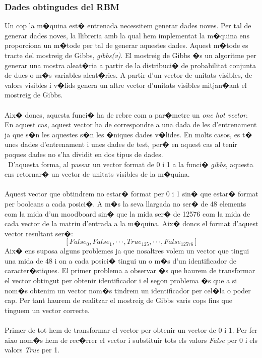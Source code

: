 \documentclass[12pt,a4paper,openright,oneside]{article}
\numberwithin{equation}{section}
\theoremstyle{definition}
\begin{document}
\subsubsection{Dades obtingudes del RBM}
Un cop la m�quina est� entrenada necessitem generar dades noves. Per tal de generar dades noves, la llibreria amb la qual hem implementat la m�quina ens proporciona un m�tode per tal de generar aquestes dades. Aquest m�tode es tracte del mostreig de Gibbs, \textit{gibbs(v)}. El mostreig de Gibbs �s un algoritme per generar una mostra aleat�ria a partir de la distribuci� de probabilitat conjunta de dues o m�s variables aleat�ries. A partir d'un vector de unitats visibles, de valors visibles i v�lids genera un altre vector d'unitats visibles mitjan�ant el mostreig de Gibbs.\\\\
Aix� doncs, aquesta funci� ha de rebre com a par�metre un \textit{one hot vector}. En aquest cas, aquest vector ha de correspondre a una dada de les d'entrenament ja que s�n les aquestes s�n les �niques dades v�lides. En molts casos, es t� unes dades d'entrenament i unes dades de test, per� en aquest cas al tenir poques dades no s'ha dividit en dos tipus de dades.\\\
D'aquesta forma, al passar un vector format de 0 i 1 a la funci� \textit{gibbs}, aquesta ens retornar� un vector de unitats visibles de la m�quina.\\\\
Aquest vector que obtindrem no estar� format per 0 i 1 sin� que estar� format per booleans a cada posici�. A m�s la seva llargada no ser� de 48 elements com la mida d'un moodboard sin� que la mida ser� de 12576 com la mida de cada vector de la matriu d'entrada a la m�quina. Aix� doncs el format d'aquest vector resultant ser�:
\[ [False_0,False_1, \cdot\cdot\cdot, True_{125}, \cdot\cdot\cdot, False_{12576}]\]
Aix� ens suposa alguns problemes ja que nosaltres volem un vector que tingui una mida de 48 i on a cada posici� tingui un o m�s d'un identificador de caracter�stiques. El primer problema a observar �s que haurem de transformar el vector obtingut per obtenir identificador i el segon problema �s que a si nom�s obtenim un vector nom�s tindrem un identificador per cel�la o poder cap. Per tant haurem de realitzar el mostreig de Gibbs varis cops fins que tinguem un vector correcte.\\\\
Primer de tot hem de transformar el vector per obtenir un vector de 0 i 1. Per fer aixo nom�s hem de rec�rrer el vector i substituir tots els valors \textit{False} per 0 i els valors \textit{True} per 1.\\\
\end{document}

